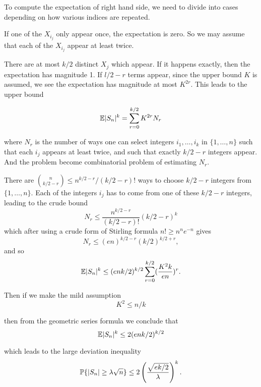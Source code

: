 To compute the expectation of right hand side, we need to divide into cases depending on  how various indices are repeated.

If one of the $X_{i_j}$ only appear once, the expectation is zero. So we may assume that each of the $X_{i_j}$ appear at least twice.

There are at most $k/2$ distinct $X_j$ which appear. If it happens exactly, then the expectation has magnitude 1. If $l/2 -r$ terms appear, since the upper bound $K$ is assumed, we see the expectation has magnitude at most $K^{2r}$. This leads to the upper bound

\begin{equation*}
    \mathbb{E} |S_n|^k = \sum_{r=0}^{k/2} K^{2r} N_r
\end{equation*}

where $N_r$ is the number of ways one can select integers $i_1,\dots,i_k$ in $\{1,\dots,n \}$ such that each $i_j$ appears at least twice, and such that exactly $k/2-r$ integers appear. And the problem become combinatorial problem of estimating $N_r$.

There are $\binom{n}{k/2-r}\leq n^{k/2-r} / (k/2-r)!$ ways to choose $k/2-r$ integers from $\{1,\dots ,n\}$. Each of the integers $i_j$ has to come from one of these $k/2-r$ integers, leading to the crude bound
\begin{equation*}
    N_r \leq \frac{n^{k/2-r}}{(k/2-r)!} (k/2-r)^k
\end{equation*}
which after using a crude form of Stirling formula $n!\geq n^n e^{-n}$ gives
\begin{equation*}
    N_r \leq (en)^{k/2-r} (k/2)^{k/2+r},
\end{equation*}
and so 
\begin{equation*}
    \mathbb{E} |S_n|^k \leq (enk/2)^{k/2} \sum_{r=0}^{k/2} (\frac{K^2k}{en})^r.
\end{equation*}

Then if we make the mild assumption 
\begin{equation}
    K^2 \leq n/k
\end{equation}

then from the geometric series formula we conclude that
\begin{equation*}
    \mathbb{E}|S_n|^k \leq 2(enk/2)^{k/2}
\end{equation*}

which leads to the large deviation inequality
\begin{equation}\label{higher moment method}
    \mathbb{P}\{|S_n|\geq \lambda\sqrt{n} \} \leq 2 \left(\frac{\sqrt{ek/2}}{\lambda}\right)^k.
\end{equation}

